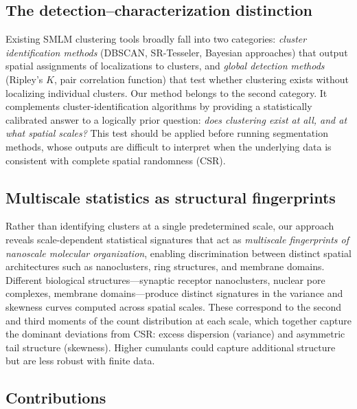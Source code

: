 \documentclass[11pt]{article}
\begin{document}
\subsection{The detection--characterization distinction}

Existing SMLM clustering tools broadly fall into two categories:
\emph{cluster identification methods} (DBSCAN, SR-Tesseler, Bayesian
approaches) that output spatial assignments of localizations to clusters,
and \emph{global detection methods} (Ripley's $K$, pair correlation
function) that test whether clustering exists without localizing
individual clusters. Our method belongs to the second category. It
complements cluster-identification algorithms by providing a statistically
calibrated answer to a logically prior question: \emph{does clustering
exist at all, and at what spatial scales?} This test should be applied
before running segmentation methods, whose outputs are difficult to
interpret when the underlying data is consistent with complete spatial
randomness (CSR).

\subsection{Multiscale statistics as structural fingerprints}

Rather than identifying clusters at a single predetermined scale, our
approach reveals scale-dependent statistical signatures that act as
\emph{multiscale fingerprints of nanoscale molecular organization},
enabling discrimination between distinct spatial architectures such as
nanoclusters, ring structures, and membrane domains. Different
biological structures---synaptic receptor nanoclusters, nuclear pore
complexes, membrane domains---produce distinct signatures in the
variance and skewness curves computed across spatial scales. These correspond
to the second and third moments of the count distribution at each scale,
which together capture the dominant deviations from CSR: excess
dispersion (variance) and asymmetric tail structure (skewness). Higher
cumulants could capture additional structure but are less robust with
finite data.

\subsection{Contributions}
\end{document}

